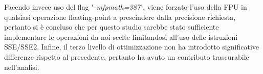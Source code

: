 \documentclass[Lau, oneside]{sapthesis}%
\begin{document}
\newline
Facendo invece uso del flag "\textit{-mfpmath=387}", viene forzato l'uso della FPU in qualsiasi operazione floating-point a prescindere dalla precisione richiesta, pertanto si è concluso che per questo studio sarebbe stato sufficiente implementare le operazioni da noi scelte limitandosi all'uso delle istruzioni SSE/SSE2.
\newline \newline
Infine, il terzo livello di ottimizzazione non ha introdotto significative differenze rispetto al precedente, pertanto ha avuto un contributo trascurabile nell'analisi.
\newline \newline





\newpage
\end{document}
